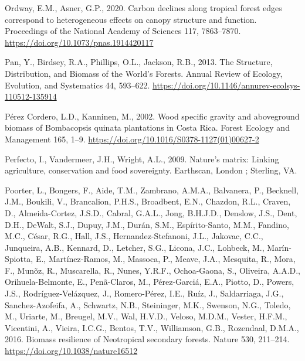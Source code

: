 \documentclass[
  12pt,
]{article}
\newlength{\cslhangindent}
\newlength{\cslentryspacingunit} %
\newenvironment{CSLReferences}[2] %
 {%
  \setlength{\parindent}{0pt}
  \ifodd #1
  \let\oldpar\par
  \def\par{\hangindent=\cslhangindent\oldpar}
  \fi
  \setlength{\parskip}{#2\cslentryspacingunit}
 }%
 {}
\begin{document}
\begin{CSLReferences}{1}{0}
\leavevmode{}%
Ordway, E.M., Asner, G.P., 2020. Carbon declines along tropical forest edges correspond to heterogeneous effects on canopy structure and function. Proceedings of the National Academy of Sciences 117, 7863--7870. \url{https://doi.org/10.1073/pnas.1914420117}

\leavevmode{}%
Pan, Y., Birdsey, R.A., Phillips, O.L., Jackson, R.B., 2013. The {Structure}, {Distribution}, and {Biomass} of the {World}'s {Forests}. Annual Review of Ecology, Evolution, and Systematics 44, 593--622. \url{https://doi.org/10.1146/annurev-ecolsys-110512-135914}

\leavevmode{}%
Pérez Cordero, L.D., Kanninen, M., 2002. Wood specific gravity and aboveground biomass of {Bombacopsis} quinata plantations in {Costa Rica}. Forest Ecology and Management 165, 1--9. \url{https://doi.org/10.1016/S0378-1127(01)00627-2}

\leavevmode{}%
Perfecto, I., Vandermeer, J.H., Wright, A.L., 2009. Nature's matrix: Linking agriculture, conservation and food sovereignty. {Earthscan}, {London ; Sterling, VA}.

\leavevmode{}%
Poorter, L., Bongers, F., Aide, T.M., Zambrano, A.M.A., Balvanera, P., Becknell, J.M., Boukili, V., Brancalion, P.H.S., Broadbent, E.N., Chazdon, R.L., Craven, D., Almeida-Cortez, J.S.D., Cabral, G.A.L., Jong, B.H.J.D., Denslow, J.S., Dent, D.H., DeWalt, S.J., Dupuy, J.M., Durán, S.M., Espírito-Santo, M.M., Fandino, M.C., César, R.G., Hall, J.S., Hernandez-Stefanoni, J.L., Jakovac, C.C., Junqueira, A.B., Kennard, D., Letcher, S.G., Licona, J.C., Lohbeck, M., Marín-Spiotta, E., Martínez-Ramos, M., Massoca, P., Meave, J.A., Mesquita, R., Mora, F., Munõz, R., Muscarella, R., Nunes, Y.R.F., Ochoa-Gaona, S., Oliveira, A.A.D., Orihuela-Belmonte, E., Penã-Claros, M., Pérez-Garciá, E.A., Piotto, D., Powers, J.S., Rodríguez-Velázquez, J., Romero-Pérez, I.E., Ruíz, J., Saldarriaga, J.G., Sanchez-Azofeifa, A., Schwartz, N.B., Steininger, M.K., Swenson, N.G., Toledo, M., Uriarte, M., Breugel, M.V., Wal, H.V.D., Veloso, M.D.M., Vester, H.F.M., Vicentini, A., Vieira, I.C.G., Bentos, T.V., Williamson, G.B., Rozendaal, D.M.A., 2016. Biomass resilience of {Neotropical} secondary forests. Nature 530, 211--214. \url{https://doi.org/10.1038/nature16512}


\end{CSLReferences}
\end{document}
